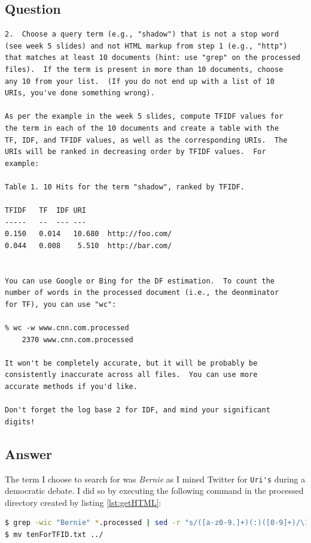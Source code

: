 \documentclass[letterpaper,10pt]{article}
\begin{document}
\subsection*{Question}
\begin{verbatim}
2.  Choose a query term (e.g., "shadow") that is not a stop word
(see week 5 slides) and not HTML markup from step 1 (e.g., "http")
that matches at least 10 documents (hint: use "grep" on the processed
files).  If the term is present in more than 10 documents, choose
any 10 from your list.  (If you do not end up with a list of 10
URIs, you've done something wrong).

As per the example in the week 5 slides, compute TFIDF values for
the term in each of the 10 documents and create a table with the
TF, IDF, and TFIDF values, as well as the corresponding URIs.  The
URIs will be ranked in decreasing order by TFIDF values.  For
example:

Table 1. 10 Hits for the term "shadow", ranked by TFIDF.

TFIDF	TF	IDF	URI
-----	--	---	---
0.150	0.014	10.680	http://foo.com/
0.044	0.008	 5.510	http://bar.com/


You can use Google or Bing for the DF estimation.  To count the
number of words in the processed document (i.e., the deonminator
for TF), you can use "wc":

% wc -w www.cnn.com.processed
    2370 www.cnn.com.processed

It won't be completely accurate, but it will be probably be
consistently inaccurate across all files.  You can use more 
accurate methods if you'd like.  

Don't forget the log base 2 for IDF, and mind your significant
digits!
\end{verbatim}
\newpage
\subsection*{Answer}
The term I choose to search for was \emph{Bernie} as I mined Twitter for \verb+Uri's+ during a democratic debate. I did so by executing the following command in the processed directory created by listing \ref{lst:getHTML}: 
\begin{lstlisting}[frame=single,language=sh,label=lst:topten]
$ grep -wic "Bernie" *.processed | sed -r "s/([a-z0-9.]+)(:)([0-9]+)/\1 \3/g" | awk '{print $2" "$1}' | sort -rn | head -n 10 | awk '{print $2}' >> tenForTFID.txt
$ mv tenForTFID.txt ../ 
\end{lstlisting}
\end{document}
